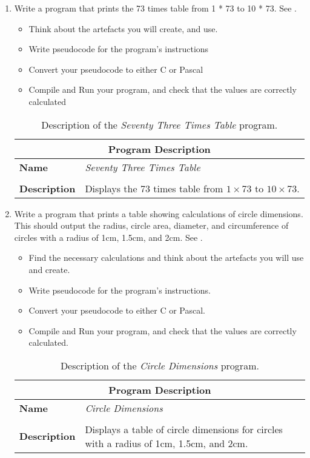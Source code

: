 \begin{enumerate}
  
  \item Write a program that prints the 73 times table from 1 * 73 to 10 * 73. See .
  \begin{itemize}
    \item Think about the artefacts you will create, and use.
    \item Write pseudocode for the program's instructions
    \item Convert your pseudocode to either C or Pascal
    \item Compile and Run your program, and check that the values are correctly calculated
  \end{itemize}
  
  \begin{table}[h]
  \centering
  \begin{tabular}{l|p{12cm}}
    \hline
    \multicolumn{2}{c}{\textbf{Program Description}} \\
    \hline
    \textbf{Name} & \emph{Seventy Three Times Table} \\
    \\
    \textbf{Description} & Displays the 73 times table from $1 \times 73$ to $10 \times 73$. \\
    \hline
  \end{tabular}
  \caption{Description of the \emph{Seventy Three Times Table} program.}
  \label{tbl:sevelty-three-times}
  \end{table}
  
  \clearpage
  \item Write a program that prints a table showing calculations of circle dimensions. This should output the radius, circle area, diameter, and circumference of circles with a radius of 1cm, 1.5cm, and 2cm. See .
  \begin{itemize}
    \item Find the necessary calculations and think about the artefacts you will use and create.
    \item Write pseudocode for the program's instructions.
    \item Convert your pseudocode to either C or Pascal.
    \item Compile and Run your program, and check that the values are correctly calculated.
  \end{itemize}
  
  \begin{table}[h]
  \centering
  \begin{tabular}{l|p{12cm}}
    \hline
    \multicolumn{2}{c}{\textbf{Program Description}} \\
    \hline
    \textbf{Name} & \emph{Circle Dimensions} \\
    \\
    \textbf{Description} & Displays a table of circle dimensions for circles with a radius of 1cm, 1.5cm, and 2cm. \\
    \hline
  \end{tabular}
  \caption{Description of the \emph{Circle Dimensions} program.}
  \label{tbl:circle-dimensions}
  \end{table}
  

\end{enumerate}
